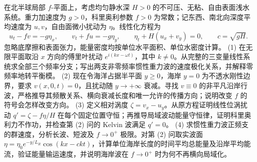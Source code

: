 在北半球局部 \(f\)-平面上，考虑均匀静水深 \(H>0\) 的不可压、无粘、自由表面浅水系统。重力加速度为 \(g>0\)，科里奥利参数 \(f>0\) 为常数；记东西、南北向深度平均速度为 \(u,v\)，自由面微小扰动为 \(\eta\)。线性化方程为
\[
u_t-fv=-g\eta_x,\qquad v_t+fu=-g\eta_y,\qquad
\eta_t+H(u_x+v_y)=0,\qquad c=\sqrt{gH}.
\]
忽略底摩擦和表面张力，能量密度均按单位水平面积、单位水密度计算。
(1) 在无限平面取沿 \(x\) 方向的傅里叶扰动 \(e^{i(kx-\omega t)}\)，其中 \(k\ne0\)。从完整的三变量线性系统求全部三个频率分支；写出两支非零频率惯性重力波的速度极化关系，并解释零频率地转平衡模。
(2) 现在令海洋占据半平面 \(y\ge0\)，海岸 \(y=0\) 为不透水刚性边界，要求 \(v(x,0,t)=0\)，且扰动随 \(y\to+\infty\) 衰减。寻找 \(v\equiv0\) 的非平凡沿岸行波，严格推导其频散关系、横向衰减长度和唯一允许的传播方向；说明改变 \(f\) 的符号会怎样改变方向。
(3) 定义相对涡度 \(\zeta=v_x-u_y\)。从原方程证明线性位涡扰动 \(q'=\zeta-f\eta/H\) 在每个固定位置守恒；再推导局域波动能量守恒律，证明科里奥利力不作功，并检查第 (2) 问的 Kelvin 波满足 \(q'=0\)。
(4) 求惯性重力波正频支的群速度，分析长波、短波及 \(f\to0^+\) 极限。对第 (2) 问取实波面
\(\eta=\eta_0e^{-y/L_R}\cos(kx-ckt)\)，计算单位海岸长度的时间平均总能量及沿岸平均能流，验证能量输运速度，并说明海岸波在 \(f\to0^+\) 时为何不再横向局域化。
